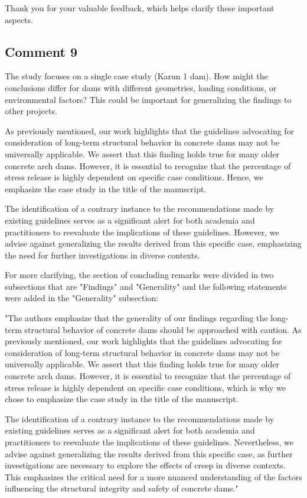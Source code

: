 \documentclass{ar2rc}
\begin{document}
	Thank you for your valuable feedback, which helps clarify these important aspects.
		
	\subsection{Comment 9}
	\RC	The study focuses on a single case study (Karun 1 dam). How might the conclusions differ for dams with different geometries, loading conditions, or environmental factors? This could be important for generalizing the findings to other projects.	
	
	\AR As previously mentioned, our work highlights that the guidelines advocating for consideration of long-term structural behavior in concrete dams may not be universally applicable. We assert that this finding holds true for many older concrete arch dams. However, it is essential to recognize that the percentage of stress release is highly dependent on specific case conditions. Hence, we emphasize the case study in the title of the manuscript.
	
	The identification of a contrary instance to the recommendations made by existing guidelines serves as a significant alert for both academia and practitioners to reevaluate the implications of these guidelines. However, we advise against generalizing the results derived from this specific case, emphasizing the need for further investigations in diverse contexts.
	
	For more clarifying, the section of concluding remarks were divided in two subsections that are "Findings" and "Generality" and the following statements were added in the "Generality" subsection:
	
	"The authors emphasize that the generality of our findings regarding the long-term structural behavior of concrete dams should be approached with caution. As previously mentioned, our work highlights that the guidelines advocating for consideration of long-term structural behavior in concrete dams may not be universally applicable. We assert that this finding holds true for many older concrete arch dams. However, it is essential to recognize that the percentage of stress release is highly dependent on specific case conditions, which is why we chose to emphasize the case study in the title of the manuscript.
	
	The identification of a contrary instance to the recommendations made by existing guidelines serves as a significant alert for both academia and practitioners to reevaluate the implications of these guidelines. Nevertheless, we advise against generalizing the results derived from this specific case, as further investigations are necessary to explore the effects of creep in diverse contexts. This emphasizes the critical need for a more nuanced understanding of the factors influencing the structural integrity and safety of concrete dams."
		
\end{document}

